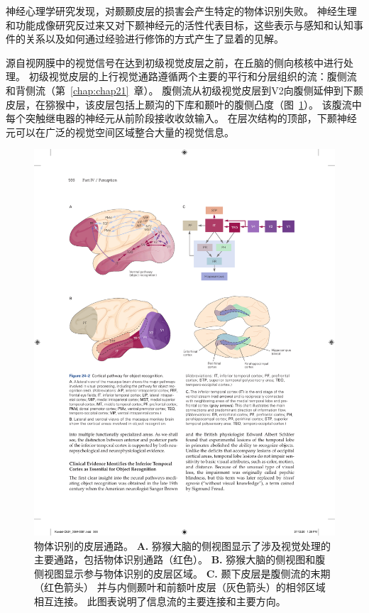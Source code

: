 神经心理学研究发现，对颞颞皮层的损害会产生特定的物体识别失败。
神经生理和功能成像研究反过来又对下颞神经元的活性代表目标，这些表示与感知和认知事件的关系以及如何通过经验进行修饰的方式产生了显着的见解。


源自视网膜中的视觉信号在达到初级视觉皮层之前，在丘脑的侧向核核中进行处理。
初级视觉皮层的上行视觉通路遵循两个主要的平行和分层组织的流：腹侧流和背侧流（第~\ref{chap:chap21}~章）。
腹侧流从初级视觉皮层到V2向腹侧延伸到下颞皮层，在猕猴中，该皮层包括上颞沟的下库和颞叶的腹侧凸度（图~\ref{fig:24_2}）。
该腹流中每个突触继电器的神经元从前阶段接收收敛输入。
在层次结构的顶部，下颞神经元可以在广泛的视觉空间区域整合大量的视觉信息。


\begin{figure}[htbp]
	\centering
	\includegraphics[width=1.0\linewidth]{chap24/fig_24_2}
	\caption{物体识别的皮层通路。
		\textbf{A.} 猕猴大脑的侧视图显示了涉及视觉处理的主要通路，包括物体识别通路（红色）。
		\textbf{B.} 猕猴大脑的侧视图和腹侧视图显示参与物体识别的皮层区域。
		\textbf{C.} 颞下皮层是腹侧流的末期（红色箭头） 并与内侧颞叶和前额叶皮层（灰色箭头）的相邻区域相互连接。
		此图表说明了信息流的主要连接和主要方向。}
	\label{fig:24_2}
\end{figure}



